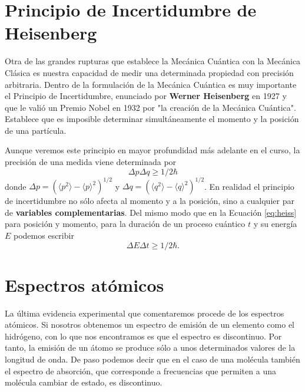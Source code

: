 \section{Principio de Incertidumbre de Heisenberg}
Otra de las grandes rupturas que establece la Mecánica Cuántica 
con la Mecánica Clásica es nuestra capacidad de medir una 
determinada propiedad con precisión arbitraria. Dentro de la 
formulación de la Mecánica Cuántica es muy importante el Principio
de Incertidumbre, enunciado por \textbf{Werner Heisenberg} en 1927
y que le valió un Premio Nobel en 1932 por "la creación de la Mecánica
Cuántica". 
Establece que es imposible determinar simultáneamente el momento 
y la posición de una partícula. 

Aunque veremos este principio en 
mayor profundidad más adelante en el curso, la precisión de una
medida viene determinada por
\begin{equation}
    \Delta p\Delta q\geq 1/2\hbar\label{eq:heiss}
\end{equation}
donde $\Delta p=(\langle p^2\rangle-\langle p \rangle^2)^{1/2}$ y
$\Delta q=(\langle q^2\rangle-\langle q\rangle^2)^{1/2}$. En realidad
el principio de incertidumbre no sólo afecta al momento y a la posición, sino a 
cualquier par de \textbf{variables complementarias}. Del mismo modo
que en la Ecuación \ref{eq:heiss} para posición y momento, para 
la duración de un proceso cuántico $t$ y su energía $E$ podemos
escribir
\begin{equation}
    \Delta E\Delta t\geq 1/2\hbar.
\end{equation}

\section{Espectros atómicos}
La última evidencia experimental que comentaremos procede de los 
espectros atómicos. Si nosotros obtenemos un espectro de emisión
de un elemento como el hidrógeno, con lo que nos encontramos
es que el espectro es discontinuo. Por tanto, la emisión de un
átomo se produce sólo a unos determinados valores de la longitud
de onda. De paso podemos decir que en el caso de una molécula 
también el espectro de absorción, que corresponde a frecuencias
que permiten a una molécula cambiar de estado, es discontinuo.

